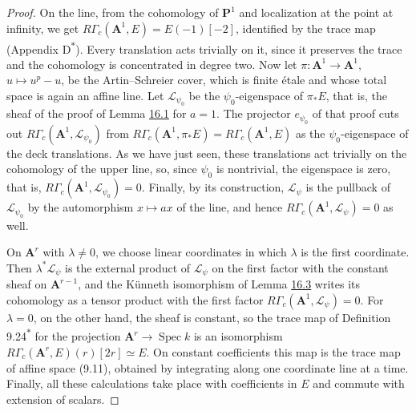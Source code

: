 \documentclass[11pt]{article}
\newcommand{\bpout}[1]{#1\textsuperscript{\hyperlink{bp-outside}{\ensuremath{\ast}}}}
\begin{document}
\begin{proof}[{Proof}]\label{bp180}%
On the line, from the cohomology of \(\mathbf P^1\) and localization at the point at infinity, we get \(R\Gamma_c(\mathbf A^1,E)=E(-1)[-2]\), identified by the trace map (Appendix \bpout{D}). Every translation acts trivially on it, since it preserves the trace and the cohomology is concentrated in degree two. Now let \(\pi:\mathbf A^1\to\mathbf A^1\), \(u\mapsto u^p-u\), be the Artin–Schreier cover, which is finite étale and whose total space is again an affine line. Let \(\mathcal L_{\psi_0}\) be the \(\psi_0\)-eigenspace of \(\pi_*E\), that is, the sheaf of the proof of Lemma \hyperref[bp171]{16.1} for \(a=1\). The projector \(e_{\psi_0}\) of that proof cuts out \(R\Gamma_c(\mathbf A^1,\mathcal L_{\psi_0})\) from \(R\Gamma_c(\mathbf A^1,\pi_*E)=R\Gamma_c(\mathbf A^1,E)\) as the \(\psi_0\)-eigenspace of the deck translations. As we have just seen, these translations act trivially on the cohomology of the upper line, so, since \(\psi_0\) is nontrivial, the eigenspace is zero, that is, \(R\Gamma_c(\mathbf A^1,\mathcal L_{\psi_0})=0\). Finally, by its construction, \(\mathcal L_\psi\) is the pullback of \(\mathcal L_{\psi_0}\) by the automorphism \(x\mapsto ax\) of the line, and hence \(R\Gamma_c(\mathbf A^1,\mathcal L_\psi)=0\) as well.

On \(\mathbf A^r\) with \(\lambda\ne0\), we choose linear coordinates in which \(\lambda\) is the first coordinate. Then \(\lambda^*\mathcal L_\psi\) is the external product of \(\mathcal L_\psi\) on the first factor with the constant sheaf on \(\mathbf A^{r-1}\), and the Künneth isomorphism of Lemma \hyperref[bp176]{16.3} writes its cohomology as a tensor product with the first factor \(R\Gamma_c(\mathbf A^1,\mathcal L_\psi)=0\). For \(\lambda=0\), on the other hand, the sheaf is constant, so the trace map of Definition \bpout{9.24} for the projection \(\mathbf A^r\to\operatorname{Spec}k\) is an isomorphism \(R\Gamma_c(\mathbf A^r,E)(r)[2r]\simeq E\). On constant coefficients this map is the trace map of affine space (9.11), obtained by integrating along one coordinate line at a time. Finally, all these calculations take place with coefficients in \(E\) and commute with extension of scalars.
\end{proof}


\end{document}
